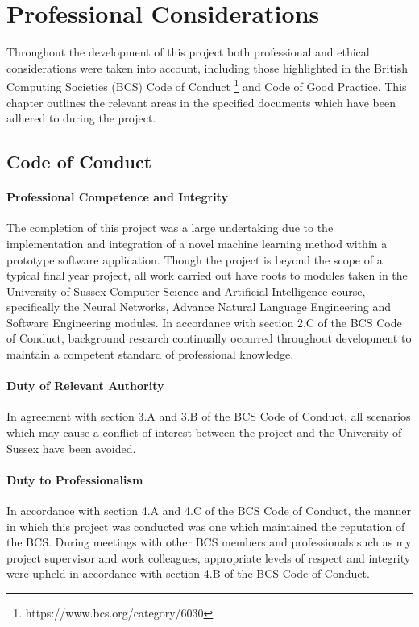 \chapter{Professional Considerations}
\label{chap:prof_con}
Throughout the development of this project both professional and ethical considerations were taken into account, including those highlighted in the British Computing Societies (BCS) Code of Conduct \footnote{https://www.bcs.org/category/6030} and Code of Good Practice. This chapter outlines the relevant areas in the specified documents which have been adhered to during the project.

\section{Code of Conduct}
\subsubsection{Professional Competence and Integrity}
The completion of this project was a large undertaking due to the implementation and integration of a novel machine learning method within a prototype software application. Though the project is beyond the scope of a typical final year project, all work carried out have roots to modules taken in the University of Sussex Computer Science and Artificial Intelligence course, specifically the Neural Networks, Advance Natural Language Engineering and Software Engineering modules. In accordance with section 2.C of the BCS Code of Conduct, background research continually occurred throughout development to maintain a competent standard of professional knowledge.

\subsubsection{Duty of Relevant Authority}
In agreement with section 3.A and 3.B of the BCS Code of Conduct, all scenarios which may cause a conflict of interest between the project and the University of Sussex have been avoided.

\subsubsection{Duty to Professionalism}
In accordance with section 4.A and 4.C of the BCS Code of Conduct, the manner in which this project was conducted was one which maintained the reputation of the BCS. During meetings with other BCS members and professionals such as my project supervisor and work colleagues, appropriate levels of respect and integrity were upheld in accordance with section 4.B of the BCS Code of Conduct.

